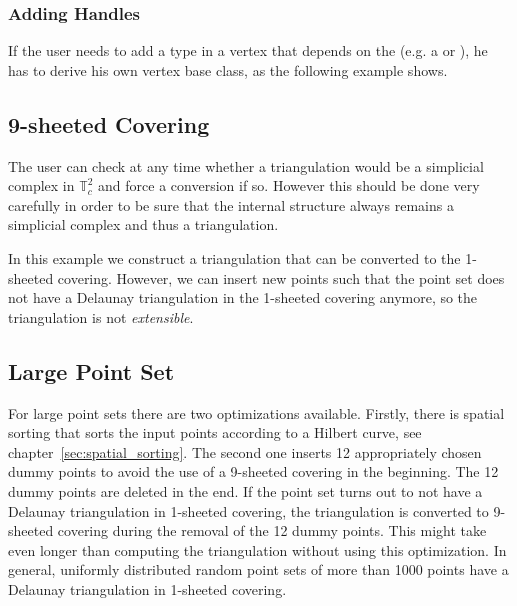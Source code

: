 
\subsubsection{Adding Handles}
If the user needs to add a type in a vertex that depends on the
 (e.g. a  or
), he has to derive his own vertex base class, as the
following example shows.


\subsection{9-sheeted Covering}
The user can check at any time whether a triangulation would be a
simplicial complex in $\mathbb T_c^2$ and force a conversion if
so. However this should be done very carefully in order to be sure
that the internal structure always remains a simplicial complex and
thus a triangulation.

In this example we construct a triangulation that can be converted to
the 1-sheeted covering. However, we can insert new points such that the
point set does not have a Delaunay triangulation in the 1-sheeted
covering anymore, so the triangulation is not \emph{extensible}.



\subsection{Large Point Set}

For large point sets there are two optimizations available. Firstly,
there is spatial sorting that sorts the input points according to a
Hilbert curve, see chapter~\ref{sec:spatial_sorting}.
The second one inserts 12 appropriately chosen dummy points to avoid
the use of a 9-sheeted covering in the beginning. The 12 dummy
points are deleted in the end. If the point set turns out to not have
a Delaunay triangulation in 1-sheeted covering, the triangulation is
converted to 9-sheeted covering during the removal of the 12 dummy
points. This might take even longer than computing the triangulation
without using this optimization. In general, uniformly distributed
random point sets of more than 1000 points have a Delaunay
triangulation in 1-sheeted covering.

